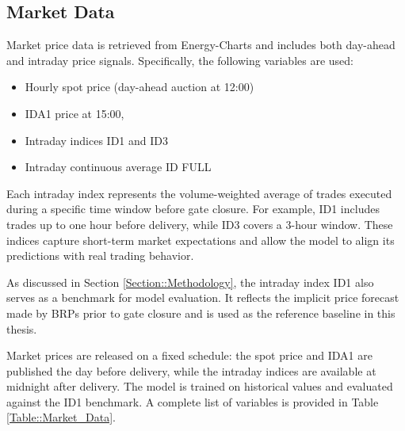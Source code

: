 \documentclass[class=scrbook, crop=false]{standalone}
\begin{document}
\subsection{Market Data}
\label{Section::Market_Data}

Market price data is retrieved from Energy-Charts and includes both day-ahead and intraday price signals. Specifically, the following variables are used:
\begin{itemize}
\item Hourly spot price (day-ahead auction at 12:00)
\item \gls{IDA1} price at 15:00,
\item Intraday indices ID1 and ID3
\item Intraday continuous average ID FULL
\end{itemize}

Each intraday index represents the volume-weighted average of trades executed during a specific time window before gate closure. For example, ID1 includes trades up to one hour before delivery, while ID3 covers a 3-hour window. These indices capture short-term market expectations and allow the model to align its predictions with real trading behavior.

As discussed in Section \ref{Section::Methodology}, the intraday index ID1 also serves as a benchmark for model evaluation. It reflects the implicit price forecast made by BRPs prior to gate closure and is used as the reference baseline in this thesis.

Market prices are released on a fixed schedule: the spot price and \gls{IDA1} are published the day before delivery, while the intraday indices are available at midnight after delivery. The model is trained on historical values and evaluated against the ID1 benchmark. A complete list of variables is provided in Table \ref{Table::Market_Data}.



\end{document}
